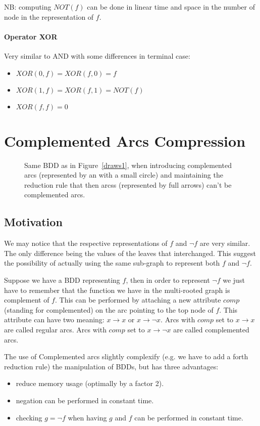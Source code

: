 \documentclass[a4paper,10pt]{article}
\newcommand{\includeframe}[4]{\makebox[#2\linewidth]{\texttt{[image: \#4]}}}
\begin{document}
NB: computing $NOT(f)$ can be done in linear time and space in the number of node in the representation of $f$.

\paragraph{Operator XOR}
Very similar to AND with some differences in terminal case:\begin{itemize}
\item $XOR(0, f) = XOR(f, 0) = f$
\item $XOR(1, f) = XOR(f, 1) = NOT(f)$
\item $XOR(f, f) = 0$
\end{itemize}

\section{Complemented Arcs Compression}
\begin{figure}
\centering
\includeframe{2}{1}{}{draws.pdf}
\caption{Same BDD as in Figure~\ref{draws1}, when introducing complemented arcs (represented by an with a small circle) and maintaining the reduction rule that then arcss (represented by full arrows) can't be complemented arcs.}
\label{draws2}
\end{figure}

\subsection{Motivation}
We may notice that the respective representations of $f$ and $\lnot f$ are very similar. 
The only difference being the values of the leaves that interchanged.
This suggest the possibility of actually using the same sub-graph to represent both $f$ and $\lnot f$.


Suppose we have a BDD representing $f$, then in order to represent $\lnot f$ we just have to remember that the function we have in the multi-rooted graph is complement of $f$.
This can be performed by attaching a new attribute $comp$ (standing for complemented) on the arc pointing to the top node of $f$.
This attribute can have two meaning: $x \rightarrow x$ or $x \rightarrow \lnot x$.
Arcs with $comp$ set to $x \rightarrow x$ are called regular arcs.
Arcs with $comp$ set to $x \rightarrow \lnot x$ are called complemented arcs.


The use of Complemented arcs slightly complexify (e.g. we have to add a forth reduction rule) the manipulation of BDDs, but has three advantages:\begin{itemize}
\item reduce memory usage (optimally by a factor 2).
\item negation can be performed in constant time.
\item checking $g = \lnot f$ when having $g$ and $f$ can be performed in constant time.
\end{itemize}
\end{document}
